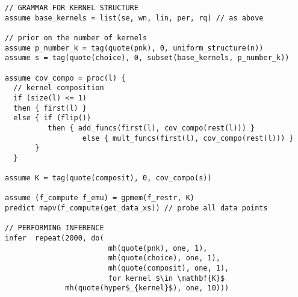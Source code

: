 \begin{mdframed}
\begin{minipage}{\linewidth}
\small
\belowcaptionskip=-10pt
\begin{lstlisting}[mathescape,label=alg:structureVent,basicstyle=\selectfont\ttfamily,numbers=none]
// GRAMMAR FOR KERNEL STRUCTURE
assume base_kernels = list(se, wn, lin, per, rq) // as above

// prior on the number of kernels
assume p_number_k = tag(quote(pnk), 0, uniform_structure(n))
assume s = tag(quote(choice), 0, subset(base_kernels, p_number_k))

assume cov_compo = proc(l) {
  // kernel composition
  if (size(l) <= 1)
  then { first(l) }
  else { if (flip()) 
		  then { add_funcs(first(l), cov_compo(rest(l))) }
                  else { mult_funcs(first(l), cov_compo(rest(l))) }
       }
  }
                          
assume K = tag(quote(composit), 0, cov_compo(s))

assume (f_compute f_emu) = gpmem(f_restr, K)
predict mapv(f_compute(get_data_xs)) // probe all data points

// PERFORMING INFERENCE  
infer  repeat(2000, do(
                        mh(quote(pnk), one, 1),
                        mh(quote(choice), one, 1),
                        mh(quote(composit), one, 1),
                        for kernel $\in \mathbf{K}$ 
			  mh(quote(hyper$_{kernel}$), one, 10)))
\end{lstlisting}
\end{minipage}
\end{mdframed}